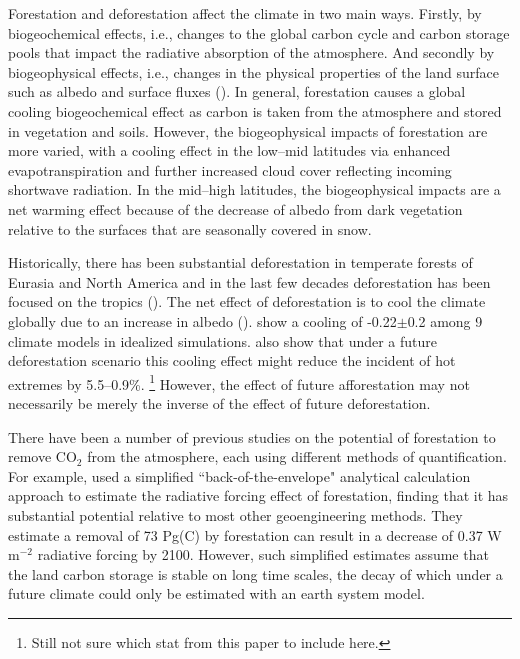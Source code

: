\documentclass[]{article}
\begin{document}
Forestation and deforestation affect the climate in two main ways.
Firstly, by biogeochemical effects, i.e., changes to the global carbon cycle and carbon storage pools that impact the radiative absorption of the atmosphere.
And secondly by biogeophysical effects, i.e., changes in the physical properties of the land surface such as albedo and surface fluxes (\cite{bala_combined_2007}).
In general, forestation causes a global cooling biogeochemical effect as carbon is taken from the atmosphere and stored in vegetation and soils.
However, the biogeophysical impacts of forestation are more varied, with a cooling effect in the low--mid latitudes via enhanced evapotranspiration and further increased cloud cover reflecting incoming shortwave radiation.
In the mid--high latitudes, the biogeophysical impacts are a net warming effect because of the decrease of albedo from dark vegetation relative to the surfaces that are seasonally covered in snow.

Historically, there has been substantial deforestation in temperate forests of Eurasia and North America and in the last few decades deforestation has been focused on the tropics (\cite{goldewijk_estimating_2001}).
The net effect of deforestation is to cool the climate globally due to an increase in albedo  (\cite{davin_climatic_2010}).
\cite{boysen_global_2020} show a cooling of -0.22$\pm$0.2 \textcelsius{} among 9 climate models in idealized simulations.
\cite{hong_impacts_2022} also show that under a future deforestation scenario this cooling effect might reduce the incident of hot extremes by 5.5--0.9\%. \footnote{Still not sure which stat from this paper to include here.}
However, the effect of future afforestation may not necessarily be merely the inverse of the effect of future deforestation.

There have been a number of previous studies on the potential of forestation to remove CO$_2$ from the atmosphere, each using different methods of quantification.
For example, \cite{lenton_radiative_2009} used a simplified ``back-of-the-envelope" analytical calculation approach to estimate the radiative forcing effect of forestation, finding that it has substantial potential relative to most other geoengineering methods.
They estimate a removal of 73 Pg(C) by forestation can result in a decrease of 0.37 W m$^{-2}$ radiative forcing by 2100.
However, such simplified estimates assume that the land carbon storage is stable on long time scales, the decay of which under a future climate could only be estimated with an earth system model.
\end{document}
